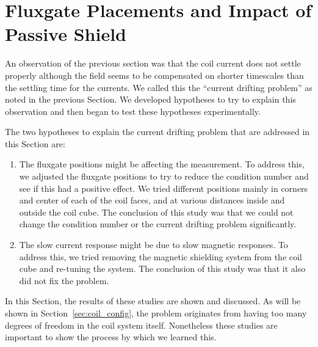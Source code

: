 \section{Fluxgate Placements and Impact of Passive Shield}\label{sec:flux_place}


An observation of the previous section was that the coil current does
not settle properly although the field seems to be compensated on
shorter timescales than the settling time for the currents.  We called
this the ``current drifting problem'' as noted in the previous
Section.  We developed hypotheses to try to explain this observation
and then began to test these hypotheses experimentally.

The two hypotheses to explain the current drifting problem that are
addressed in this Section are:
\begin{enumerate}
\item The fluxgate positions might be affecting the measurement.   To address this, we adjusted the fluxgate positions to try to reduce the condition number and see if this had a positive effect.  We tried different positions mainly in
corners and center of each of the coil faces, and at various distances
inside and outside the coil cube.  The conclusion of this study was
that we could not change the condition number or the current drifting
problem significantly.
\item The slow current response might be due to slow magnetic responses.
To address this, we tried removing the magnetic shielding system from
the coil cube and re-tuning the system.  The conclusion of this study
was that it also did not fix the problem.
\end{enumerate}
In this Section, the results of these studies are shown and discussed.
As will be shown in Section~\ref{sec:coil_config}, the problem
originates from having too many degrees of freedom in the coil system
itself.  Nonetheless these studies are important to show the process
by which we learned this.

